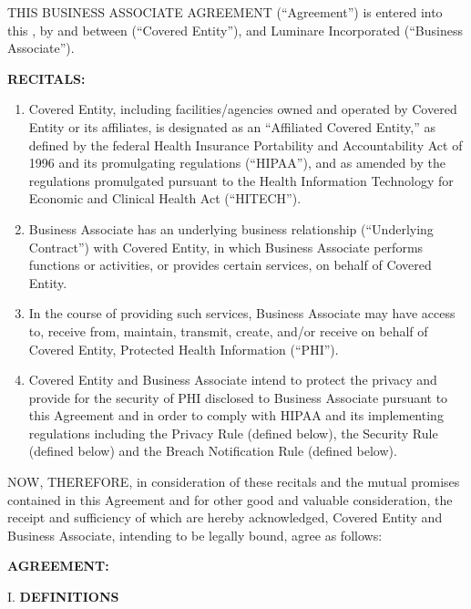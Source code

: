 \documentclass[11pt,a4paper]{article} %
\providecommand{\tightlist}{%
  \setlength{\itemsep}{0pt}\setlength{\parskip}{0pt}}
\begin{document}
THIS BUSINESS ASSOCIATE AGREEMENT (``Agreement'') is entered into this
, by and between  (``Covered
Entity''), and Luminare Incorporated (``Business Associate'').

\textbf{RECITALS:}
\begin{enumerate}
\def\labelenumi{\Alph{enumi}.}
\tightlist
\item

 Covered Entity, including facilities/agencies owned and operated by
Covered Entity or its affiliates, is designated as an ``Affiliated
Covered Entity,'' as defined by the federal Health Insurance Portability
and Accountability Act of 1996 and its promulgating regulations
(``HIPAA''), and as amended by the regulations promulgated pursuant to
the Health Information Technology for Economic and Clinical Health Act
(``HITECH'').
\item

 Business Associate has an underlying business relationship
(``Underlying Contract'') with Covered Entity, in which Business
Associate performs functions or activities, or provides certain
services, on behalf of Covered Entity.
\item

 In the course of providing such services, Business Associate may have
access to, receive from, maintain, transmit, create, and/or receive on
behalf of Covered Entity, Protected Health Information (``PHI'').
\item

 Covered Entity and Business Associate intend to protect the privacy
and provide for the security of PHI disclosed to Business Associate
pursuant to this Agreement and in order to comply with HIPAA and its
implementing regulations including the Privacy Rule (defined below), the
Security Rule (defined below) and the Breach Notification Rule (defined
below).
\end{enumerate}

NOW, THEREFORE, in consideration of these recitals and the mutual
promises contained in this Agreement and for other good and valuable
consideration, the receipt and sufficiency of which are hereby
acknowledged, Covered Entity and Business Associate, intending to be
legally bound, agree as follows:

\newpage

\textbf{AGREEMENT:}

I. \textbf{DEFINITIONS}
\end{document}
